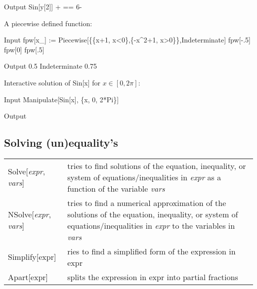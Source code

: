 \begin{example}
\begin{mdframed}[default,backgroundcolor=gray!40,roundcorner=8pt]
\begin{mmaCell}[]{Output}
		Sin[y[2]] +  == 6-
	\end{mmaCell}
\end{mdframed}	
	A piecewise defined function:
\begin{mdframed}[default,backgroundcolor=gray!40,roundcorner=8pt]
\begin{mmaCell}[functionlocal={x_,x}]{Input} 
	 fpw[x_] := Piecewise[\{\{x+1, x<0\},\{-x^2+1, x>0\}\},Indeterminate]
	 fpw[-.5]
	 fpw[0]
	 fpw[.5]
\end{mmaCell}
\begin{mmaCell}[]{Output}
	 0.5
	 Indeterminate
	 0.75
\end{mmaCell}
\end{mdframed}
Interactive solution of Sin[x] for $x\in[0,2\pi]$:

\begin{mdframed}[default,backgroundcolor=gray!40,roundcorner=8pt]
\begin{mmaCell}[functionlocal={x_,x}]{Input} 
	 Manipulate[Sin[x], \{x, 0, 2*Pi\}]
\end{mmaCell}

\begin{mmaCell}[moregraphics={moreig={scale=.6}}]{Output}
\end{mmaCell}

\end{mdframed}

\end{example}

\subsection{Solving (un)equality's}
\begin{tabular}{>{\hfill}p{5cm}p{12cm}}
	Solve[\textit{expr}, \textit{vars}]		&	tries to find solutions of the equation, inequality, or system of equations/inequalities in \textit{expr} as a function of the variable \textit{vars}\\
	NSolve[\textit{expr}, \textit{vars}]		&	tries to find a numerical approximation of the solutions of the equation, inequality, or system of equations/inequalities in \textit{expr} to the variables in \textit{vars}\\
	Simplify[expr]			&	ries to find a simplified form of the expression in expr\\
	Apart[expr]			&	splits the expression in expr into partial fractions\\
\end{tabular}

